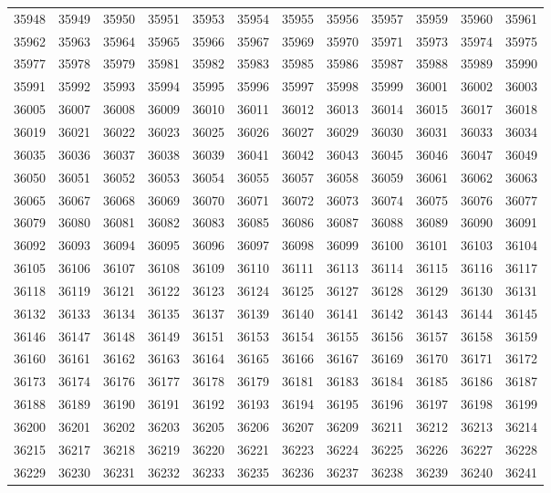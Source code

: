 \begin{center}
\begin{longtable}{llllllllllll}
35948 &35949 &35950 &35951 &35953 &35954 &35955 &35956 &35957 &35959 &35960 &35961 \\
35962 &35963 &35964 &35965 &35966 &35967 &35969 &35970 &35971 &35973 &35974 &35975 \\
35977 &35978 &35979 &35981 &35982 &35983 &35985 &35986 &35987 &35988 &35989 &35990 \\
35991 &35992 &35993 &35994 &35995 &35996 &35997 &35998 &35999 &36001 &36002 &36003 \\
36005 &36007 &36008 &36009 &36010 &36011 &36012 &36013 &36014 &36015 &36017 &36018 \\
36019 &36021 &36022 &36023 &36025 &36026 &36027 &36029 &36030 &36031 &36033 &36034 \\
36035 &36036 &36037 &36038 &36039 &36041 &36042 &36043 &36045 &36046 &36047 &36049 \\
36050 &36051 &36052 &36053 &36054 &36055 &36057 &36058 &36059 &36061 &36062 &36063 \\
36065 &36067 &36068 &36069 &36070 &36071 &36072 &36073 &36074 &36075 &36076 &36077 \\
36079 &36080 &36081 &36082 &36083 &36085 &36086 &36087 &36088 &36089 &36090 &36091 \\
36092 &36093 &36094 &36095 &36096 &36097 &36098 &36099 &36100 &36101 &36103 &36104 \\
36105 &36106 &36107 &36108 &36109 &36110 &36111 &36113 &36114 &36115 &36116 &36117 \\
36118 &36119 &36121 &36122 &36123 &36124 &36125 &36127 &36128 &36129 &36130 &36131 \\
36132 &36133 &36134 &36135 &36137 &36139 &36140 &36141 &36142 &36143 &36144 &36145 \\
36146 &36147 &36148 &36149 &36151 &36153 &36154 &36155 &36156 &36157 &36158 &36159 \\
36160 &36161 &36162 &36163 &36164 &36165 &36166 &36167 &36169 &36170 &36171 &36172 \\
36173 &36174 &36176 &36177 &36178 &36179 &36181 &36183 &36184 &36185 &36186 &36187 \\
36188 &36189 &36190 &36191 &36192 &36193 &36194 &36195 &36196 &36197 &36198 &36199 \\
36200 &36201 &36202 &36203 &36205 &36206 &36207 &36209 &36211 &36212 &36213 &36214 \\
36215 &36217 &36218 &36219 &36220 &36221 &36223 &36224 &36225 &36226 &36227 &36228 \\
36229 &36230 &36231 &36232 &36233 &36235 &36236 &36237 &36238 &36239 &36240 &36241 \\

\end{longtable}
\end{center}
